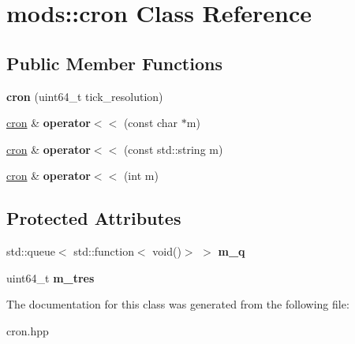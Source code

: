 \hypertarget{classmods_1_1cron}{}\section{mods\+:\+:cron Class Reference}
\label{classmods_1_1cron}
\subsection*{Public Member Functions}
\begin{DoxyCompactItemize}
\item 
\mbox{\label{classmods_1_1cron_ab6e1e5423e97445cdeb1d632419de6f6}} 
{\bfseries cron} (uint64\+\_\+t tick\+\_\+resolution)
\item 
\mbox{\label{classmods_1_1cron_a4f2aba303560b3412cd4cb2daad9659b}} 
\hyperlink{classmods_1_1cron}{cron} \& {\bfseries operator$<$$<$} (const char $\ast$m)
\item 
\mbox{\label{classmods_1_1cron_a08c9e291d2484b3a5952fb9734f2de5a}} 
\hyperlink{classmods_1_1cron}{cron} \& {\bfseries operator$<$$<$} (const std\+::string m)
\item 
\mbox{\label{classmods_1_1cron_a0ac721fe1491374c76c1ab1f7d54e9f7}} 
\hyperlink{classmods_1_1cron}{cron} \& {\bfseries operator$<$$<$} (int m)
\end{DoxyCompactItemize}
\subsection*{Protected Attributes}
\begin{DoxyCompactItemize}
\item 
\mbox{\label{classmods_1_1cron_a8baea8bea3f38dd23b6209c619e35f78}} 
std\+::queue$<$ std\+::function$<$ void()$>$ $>$ {\bfseries m\+\_\+q}
\item 
\mbox{\label{classmods_1_1cron_a4de09352931aedbf850972597702d12f}} 
uint64\+\_\+t {\bfseries m\+\_\+tres}
\end{DoxyCompactItemize}


The documentation for this class was generated from the following file\+:\begin{DoxyCompactItemize}
\item 
cron.\+hpp\end{DoxyCompactItemize}
